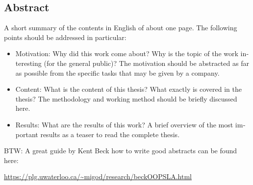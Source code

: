 

\begin{otherlanguage}{american}
	\chapter*{Abstract}
	A short summary of the contents in English of about one page. The following points should be addressed in particular:
	\begin{itemize}
		\item Motivation: Why did this work come about? Why is the topic of the work interesting (for the general public)? The motivation should be abstracted as far as possible from the specific tasks that may be given by a company.
		\item Content: What is the content of this thesis? What exactly is covered in the thesis? The methodology and working method should be briefly discussed here.
		\item Results: What are the results of this work? A brief overview of the most important results as a teaser to read the complete thesis.
	\end{itemize}
	\medskip
	
	\noindent
	BTW: A great guide by Kent Beck how to write good abstracts can be found here:
	\begin{center}
		\url{https://plg.uwaterloo.ca/~migod/research/beckOOPSLA.html}
	\end{center}
\end{otherlanguage}
